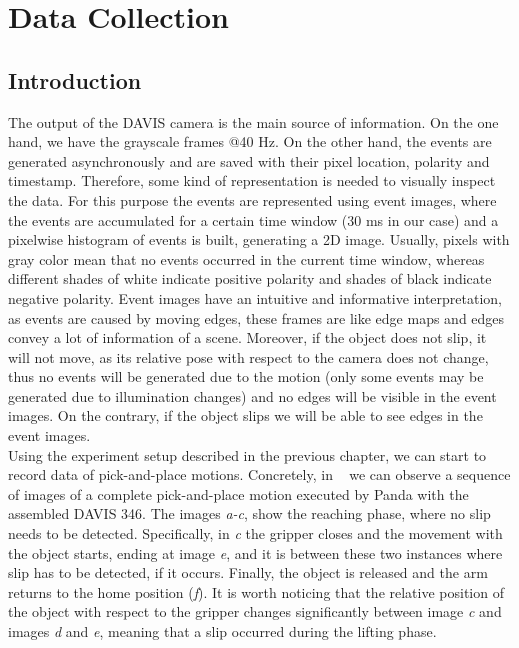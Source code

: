 \cleardoublepage
\chapter{Data Collection}\label{sec:data}

\section{Introduction}

The output of the DAVIS camera is the main source of information. On the one hand, we have the grayscale frames @40 Hz. On the other hand, the events are generated asynchronously and are saved with their pixel location, polarity and timestamp. Therefore, some kind of representation is needed to visually inspect the data. For this purpose the events are represented using event images, where the events are accumulated for a certain time window (30 ms in our case) and a pixelwise histogram of events is built, generating a 2D image. Usually, pixels with gray color mean that no events occurred in the current time window, whereas different shades of white indicate positive polarity and shades of black indicate negative polarity. Event images have an intuitive and informative interpretation, as events are caused by moving edges, these frames are like edge maps and edges convey a lot of information of a scene. Moreover, if the object does not slip, it will not move, as its relative pose with respect to the camera does not change, thus no events will be generated due to the motion (only some events may be generated due to illumination changes) and no edges will be visible in the event images. On the contrary, if the object slips we will be able to see edges in the event images.\\

Using the experiment setup described in the previous chapter, we can start to record data of pick-and-place motions. Concretely, in ~ we can observe a sequence of images of a complete pick-and-place motion executed by Panda with the assembled DAVIS 346. The images \textit{a-c}, show the reaching phase, where no slip needs to be detected. Specifically, in \textit{c} the gripper closes and the movement with the object starts, ending at image \textit{e}, and it is between these two instances where slip has to be detected, if it occurs. Finally, the object is released and the arm returns to the home position (\textit{f}). It is worth noticing that the relative position of the object with respect to the gripper changes significantly between image \textit{c} and images \textit{d} and \textit{e}, meaning that a slip occurred during the lifting phase.\\

